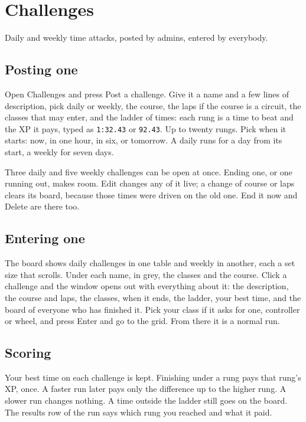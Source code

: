 \documentclass[11pt,a4paper]{article}
\newcommand{\code}[1]{\texttt{\small #1}}
\begin{document}
\section{Challenges}

Daily and weekly time attacks, posted by admins, entered by everybody.

\subsection*{Posting one}

Open Challenges and press Post a challenge. Give it a name and a few lines
of description, pick daily or weekly, the course, the laps if the course
is a circuit, the classes that may enter, and the ladder of times: each
rung is a time to beat and the XP it pays, typed as \code{1:32.43} or
\code{92.43}. Up to twenty rungs. Pick when it starts: now, in one hour,
in six, or tomorrow. A daily runs for a day from its start, a weekly for
seven days.

Three daily and five weekly challenges can be open at once. Ending one, or
one running out, makes room. Edit changes any of it live; a change of
course or laps clears its board, because those times were driven on the
old one. End it now and Delete are there too.

\subsection*{Entering one}

The board shows daily challenges in one table and weekly in another, each
a set size that scrolls. Under each name, in grey, the classes and the
course. Click a challenge and the window opens out with everything about
it: the description, the course and laps, the classes, when it ends, the
ladder, your best time, and the board of everyone who has finished it.
Pick your class if it asks for one, controller or wheel, and press Enter
and go to the grid. From there it is a normal run.

\subsection*{Scoring}

Your best time on each challenge is kept. Finishing under a rung pays
that rung's XP, once. A faster run later pays only the difference up to
the higher rung. A slower run changes nothing. A time outside the ladder
still goes on the board. The results row of the run says which rung you
reached and what it paid.
\end{document}
